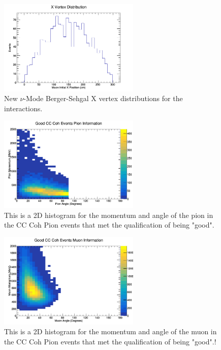 \documentclass[11pt]{article}
\begin{document}
\begin{figure}[H]
\centering
\includegraphics[width=0.6\textwidth]{NewNMBergerSehgalImages/4-XVertexDistributionNMBS.png}
\caption{New $\nu$-Mode Berger-Sehgal X vertex distributions for the interactions.}
\end{figure}

\begin{figure}[H]
\centering
\includegraphics[width=0.6\textwidth]{NewNMBergerSehgalImages/5-GoodCCCohPionInfoNMBS.png}
\caption{This is a 2D histogram for the momentum and angle of the pion in the CC Coh Pion events that met the qualification of being "good".}
\end{figure}

\begin{figure}[H]
\centering
\includegraphics[width=0.6\textwidth]{NewNMBergerSehgalImages/6-GoodCCCohMuonInfoNMBS.png}
\caption{This is a 2D histogram for the momentum and angle of the muon in the CC Coh Pion events that met the qualification of being "good".!}
\end{figure}
\end{document}
